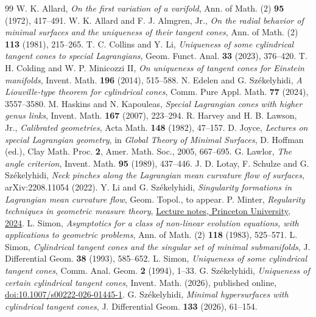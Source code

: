\documentclass[11pt,a4paper]{article}
\numberwithin{equation}{section}
\theoremstyle{definition}
\theoremstyle{remark}
\begin{document}
	\begin{thebibliography}{99}
		 W. K. Allard, \emph{On the first variation of a varifold},
		Ann. of Math. (2) \textbf{95} (1972), 417--491.
		 W. K. Allard and F. J. Almgren, Jr.,
		\emph{On the radial behavior of minimal surfaces and the uniqueness of
			their tangent cones}, Ann. of Math. (2) \textbf{113} (1981), 215--265.
		 T. C. Collins and Y. Li, \emph{Uniqueness of some cylindrical
			tangent cones to special Lagrangians}, Geom. Funct. Anal. \textbf{33}
		(2023), 376--420.
		 T. H. Colding and W. P. Minicozzi II, \emph{On uniqueness of
			tangent cones for Einstein manifolds}, Invent. Math. \textbf{196}
		(2014), 515--588.
		 N. Edelen and G. Sz\'ekelyhidi, \emph{A Liouville-type theorem
			for cylindrical cones}, Comm. Pure Appl. Math. \textbf{77} (2024),
		3557--3580.
		 M. Haskins and N. Kapouleas, \emph{Special Lagrangian cones
			with higher genus links}, Invent. Math. \textbf{167} (2007), 223--294.
		 R. Harvey and H. B. Lawson, Jr., \emph{Calibrated geometries},
		Acta Math. \textbf{148} (1982), 47--157.
		 D. Joyce, \emph{Lectures on special Lagrangian geometry},
		in \emph{Global Theory of Minimal Surfaces}, D. Hoffman (ed.),
		Clay Math. Proc. \textbf{2}, Amer. Math. Soc., 2005, 667--695.
		 G. Lawlor, \emph{The angle criterion},
		Invent. Math. \textbf{95} (1989), 437--446.
		 J. D. Lotay, F. Schulze and G. Sz\'ekelyhidi,
		\emph{Neck pinches along the Lagrangian mean curvature flow of surfaces},
		arXiv:2208.11054 (2022).
		 Y. Li and G. Sz\'ekelyhidi,
		\emph{Singularity formations in Lagrangian mean curvature flow},
		Geom. Topol., to appear.
		 P. Minter, \emph{Regularity techniques in geometric
			measure theory},
		\href{https://minterscompactness.wordpress.com/wp-content/uploads/2024/12/reg-in-gmt-notes.pdf}{Lecture notes, Princeton University, 2024}.
		 L. Simon, \emph{Asymptotics for a class of non-linear
			evolution equations, with applications to geometric problems},
		Ann. of Math. (2) \textbf{118} (1983), 525--571.
		 L. Simon, \emph{Cylindrical tangent cones and the singular
			set of minimal submanifolds}, J. Differential Geom. \textbf{38}
		(1993), 585--652.
		 L. Simon, \emph{Uniqueness of some cylindrical tangent
			cones}, Comm. Anal. Geom. \textbf{2} (1994), 1--33.
		 G. Sz\'ekelyhidi, \emph{Uniqueness of certain cylindrical
			tangent cones}, Invent. Math. (2026), published online,
		\href{https://doi.org/10.1007/s00222-026-01445-1}{doi:10.1007/s00222-026-01445-1}.
		 G. Sz\'ekelyhidi, \emph{Minimal hypersurfaces with
			cylindrical tangent cones}, J. Differential Geom. \textbf{133}
		(2026), 61--154.
	\end{thebibliography}
\end{document}
